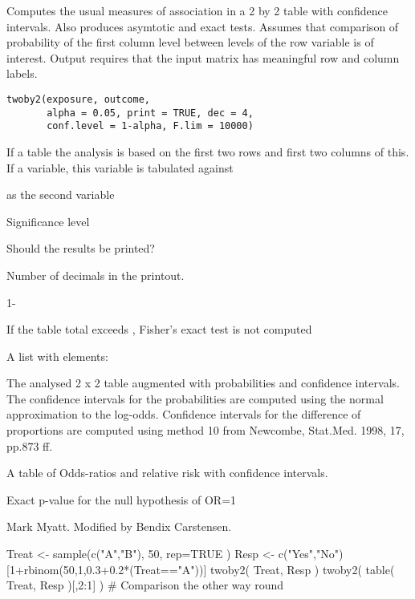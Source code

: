 \begin{Description}\relax
Computes the usual measures of association in a 2 by 2 table with
confidence intervals. Also produces asymtotic and exact tests. Assumes
that comparison of probability of the first column level between
levels of the row variable is of interest. Output requires that the
input matrix has meaningful row and column labels.
\end{Description}
\begin{Usage}
\begin{verbatim}
twoby2(exposure, outcome,
       alpha = 0.05, print = TRUE, dec = 4,
       conf.level = 1-alpha, F.lim = 10000)
\end{verbatim}
\end{Usage}
\begin{Arguments}
\begin{ldescription}
\item[\code{exposure}] If a table the analysis is based on the first two rows
and first two columns of this. If a variable, this variable is
tabulated against
\item[\code{outcome}] as the second variable
\item[\code{alpha}] Significance level
\item[\code{print}] Should the results be printed?
\item[\code{dec}] Number of decimals in the printout.
\item[\code{conf.level}] 1-
\item[\code{F.lim}] If the table total exceeds , Fisher's exact
test is not computed
\end{ldescription}
\end{Arguments}
\begin{Value}
A list with elements:
\begin{ldescription}
\item[\code{table}] The analysed 2 x 2 table augmented with probabilities and
confidence intervals. The confidence intervals for the probabilities
are computed using the normal approximation to the
log-odds. Confidence intervals for the difference of proportions are
computed using method 10 from Newcombe, Stat.Med. 1998, 17, pp.873
ff.
\item[\code{measures}] A table of Odds-ratios and relative risk with
confidence intervals.
\item[\code{p.value}] Exact p-value for the null hypothesis of OR=1
\end{ldescription}
\end{Value}
\begin{Author}\relax
Mark Myatt. Modified by Bendix Carstensen.
\end{Author}
\begin{Examples}
\begin{ExampleCode}
Treat <- sample(c("A","B"), 50, rep=TRUE )
Resp <- c("Yes","No")[1+rbinom(50,1,0.3+0.2*(Treat=="A"))]
twoby2( Treat, Resp )                 
twoby2( table( Treat, Resp )[,2:1] ) # Comparison the other way round
\end{ExampleCode}
\end{Examples}

